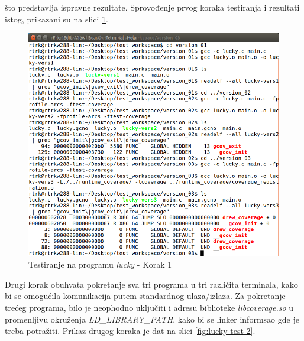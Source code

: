 \documentclass[12pt,oneside]{memoir}
\newcommand{\strano}[1]{\textit{#1}}
\begin{document}
\noindent što predstavlja ispravne rezultate. Sprovođenje prvog koraka testiranja i rezultati istog, prikazani su na slici \ref{fig:lucky-test-1}.

\begin{figure}[!ht]
  \centering
  \includegraphics[width=\textwidth]{img/lucky1-ng.png}
  \caption{Testiranje na programu \strano{lucky} - Korak 1}
  \label{fig:lucky-test-1}
\end{figure}

Drugi korak obuhvata pokretanje sva tri programa u tri različita terminala, kako bi se omogućila komunikacija putem standardnog ulaza/izlaza. Za pokretanje trećeg programa, bilo je neophodno uključiti i adresu biblioteke \strano{libcoverage.so} u promenljivu okruženja \strano{LD\_LIBRARY\_PATH}, kako bi se linker informsao gde je treba potražiti. Prikaz drugog koraka je dat na slici \ref{fig:lucky-test-2}. 
\end{document}
